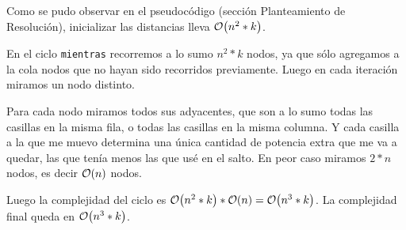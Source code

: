 \documentclass[11pt, a4paper, twoside]{article}
\begin{document}
{}

Como se pudo observar en el pseudocódigo (sección Planteamiento de Resolución), inicializar las distancias 
lleva $\mathop{}\mathopen{}\mathcal{O}\mathopen{}\left(n^2 * k\right)$.

En el ciclo \texttt{mientras} recorremos a lo sumo $n^2 * k$ nodos, ya que sólo agregamos a la cola nodos que no hayan sido recorridos previamente. Luego en cada iteración miramos un nodo distinto.

Para cada nodo miramos todos sus adyacentes, que son a lo sumo todas las casillas en la misma fila, o todas
las casillas en la misma columna. Y cada casilla a la que me muevo determina una única cantidad de potencia extra que me va a quedar, las que tenía menos las que usé en el salto.
En peor caso miramos $2*n$ nodos, es decir $\mathop{}\mathopen{}\mathcal{O}\mathopen{}\left(n\right)$ nodos.

Luego la complejidad del ciclo es $\mathop{}\mathopen{}\mathcal{O}\mathopen{}\left(n^2 * k\right) * \mathop{}\mathopen{}\mathcal{O}\mathopen{}\left(n\right) = \mathop{}\mathopen{}\mathcal{O}\mathopen{}\left(n^3 * k\right)$. La complejidad final queda en $\mathop{}\mathopen{}\mathcal{O}\mathopen{}\left(n^3 * k\right)$.
\end{document}

